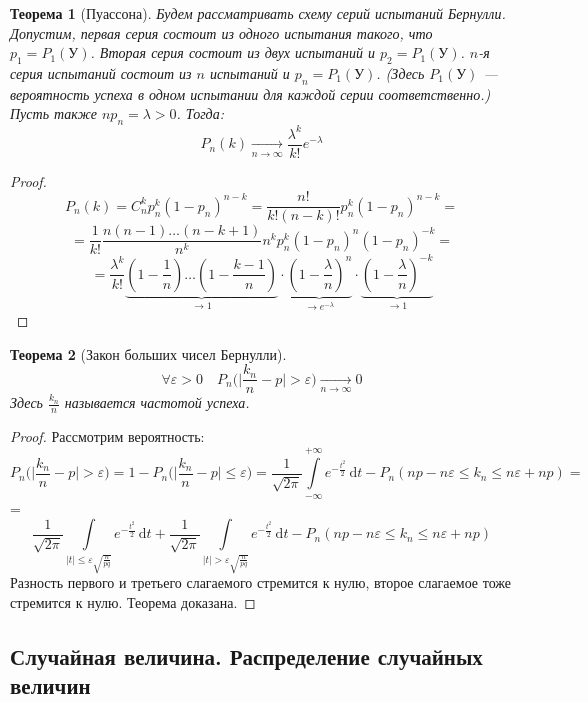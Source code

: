 \documentclass[11pt,openany,a4paper]{scrartcl}
\theoremstyle{plain}
\newtheorem{theorem}{Теорема}[subsection]
\theoremstyle{definition}
\newcommand{\underto}[1]{\xrightarrow[#1]{}}
\newcommand{\dif}{\, \mathrm d}
\begin{document}
\begin{theorem}[Пуассона]
    Будем рассматривать схему серий испытаний Бернулли. Допустим, первая серия 
    состоит из одного испытания такого, что $p_1 = P_1(У)$. Вторая серия
    состоит из двух испытаний и $p_2 = P_1(У)$.
    $n$-я серия испытаний состоит из $n$ испытаний и $p_n = P_1(У)$.
    (Здесь $P_1(У)$ — вероятность успеха в одном испытании для каждой серии 
    соответственно.)
    Пусть также $np_n = \lambda > 0$. Тогда:
    $$
    P_n(k) \underto{n \to \infty} \frac{\lambda^k}{k!}e^{-\lambda}
    $$
\end{theorem}
\begin{proof}
    $$
    P_n(k) = C_n^k p_n^k(1 - p_n)^{n-k} = \frac{n!}{k!(n-k)!}p_n^k(1-p_n)^{n-k} =
    $$
    $$
    = \frac{1}{k!} \frac{n(n-1)\ldots(n-k+1)}{n^k} n^k
    p_n^k(1-p_n)^n(1-p_n)^{-k} =
    $$
    $$
    = \frac{\lambda^k}{k!}
    \underbrace{(1 - \frac{1}{n})\ldots(1 - \frac{k-1}{n})}_{\to 1} \cdot
    \underbrace{(1 - \frac{\lambda}{n})^n}_{\to e^{-\lambda}}\cdot
    \underbrace{(1 - \frac{\lambda}{n})^{-k}}_{\to 1}    
    $$
\end{proof}

\begin{theorem}[Закон больших чисел Бернулли]\label{large_numbers_bernoulli}
    $$
    \forall \varepsilon > 0\quad P_n\bigg(\bigg|\frac{k_n}{n} -
    p\bigg| > \varepsilon\bigg)
    \underto{n \to \infty} 0
    $$
    Здесь $\frac{k_n}{n}$ называется частотой успеха.
\end{theorem}
\begin{proof}
    Рассмотрим вероятность:
    $$
    P_n\big(\big|\frac{k_n}{n} -
    p\big| > \varepsilon\big) = 1 - P_n(\big|\frac{k_n}{n} -
    p\big| \leqslant \varepsilon\big) =
    \frac{1}{\sqrt{2\pi}}
    \int\limits_{-\infty}^{+\infty}e^{-\frac{t^2}{2}} \dif t -
    P_n(np - n\varepsilon \leqslant k_n \leqslant n\varepsilon + np) =
    $$
    = $$
    \frac{1}{\sqrt{2\pi}}
    \int\limits_{|t|\leqslant \varepsilon \sqrt{\frac{n}{pq}}}
    e^{-\frac{t^2}{2}} \dif t + \frac{1}{\sqrt{2\pi}}
    \int\limits_{|t| > \varepsilon \sqrt{\frac{n}{pq}}}
    e^{-\frac{t^2}{2}} \dif t -
    P_n(np - n\varepsilon \leqslant k_n \leqslant n\varepsilon + np)
    $$
    Разность первого и третьего слагаемого стремится к нулю, второе слагаемое тоже
    стремится к нулю. Теорема доказана.
\end{proof}

\subsection{Случайная величина. Распределение случайных величин}
\end{document}
